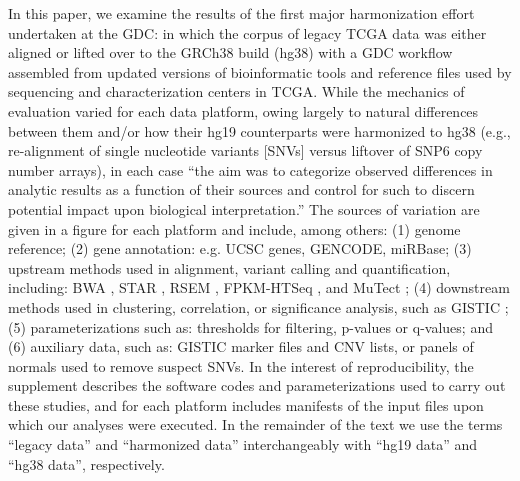 In this paper, we examine the results of the first major harmonization effort undertaken at the GDC: in which the corpus of legacy TCGA data was either aligned or lifted over to the GRCh38 build (hg38) with a GDC workflow assembled from updated versions of bioinformatic tools and reference files used by sequencing and characterization centers in TCGA. While the mechanics of evaluation varied for each data platform, owing largely to natural differences between them and/or how their hg19 counterparts were harmonized to hg38 (e.g., re-alignment of single nucleotide variants [SNVs] versus liftover of SNP6 copy number arrays), in each case \enquote{the aim was to categorize observed differences in analytic results as a function of their sources and control for such to discern potential impact upon biological interpretation.} The sources of variation are given in a figure for each platform and include, among others: (1) genome reference; (2) gene annotation: e.g. UCSC genes, GENCODE, miRBase; (3) upstream methods used in alignment, variant calling and quantification, including: BWA \cite{lih_durbinr:BWAShortRead2009}, STAR \cite{dobina_gingerastr:STARUltrafast2013}, RSEM \cite{lib_deweycn:RSEMAccurate2011}, FPKM-HTSeq \cite{anderss_huberw:HTSeqPython2015}, and MuTect \cite{cibulskisk_getzg:SensitiveDetection2013}; (4) downstream methods used in clustering, correlation, or significance analysis, such as GISTIC \cite{mermelch_getzg:GISTIC2Facilitates2011}; (5) parameterizations such as: thresholds for filtering, p-values or q-values; and (6) auxiliary data, such as: GISTIC marker files and CNV lists, or panels of normals used to remove suspect SNVs. In the interest of reproducibility, the supplement describes the software codes and parameterizations used to carry out these studies, and for each platform includes manifests of the input files upon which our analyses were executed. In the remainder of the text we use the terms ``legacy data'' and ``harmonized data'' interchangeably with ``hg19 data'' and ``hg38 data'', respectively.
